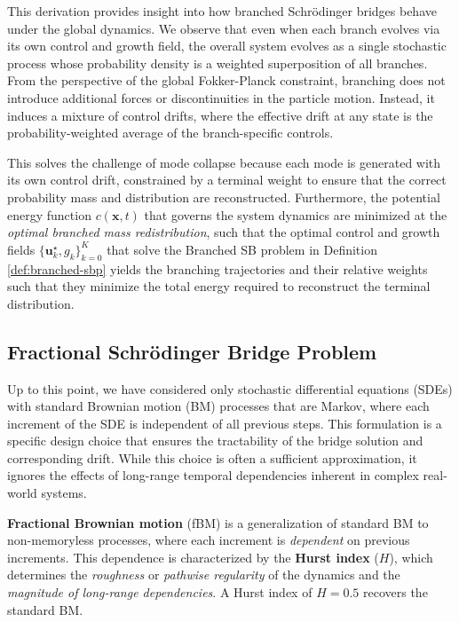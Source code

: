 \documentclass{article}
\newcommand{\boldtext}[1]{\textbf{\textcolor{MyGreen}{#1}}}
\begin{document}
This derivation provides insight into how branched Schrödinger bridges behave under the global dynamics. We observe that even when each branch evolves via its own control and growth field, the overall system evolves as a single stochastic process whose probability density is a weighted superposition of all branches. From the perspective of the global Fokker-Planck constraint, branching does not introduce additional forces or discontinuities in the particle motion. Instead, it induces a mixture of control drifts, where the effective drift at any state is the probability-weighted average of the branch-specific controls.

This solves the challenge of mode collapse because each mode is generated with its own control drift, constrained by a terminal weight to ensure that the correct probability mass and distribution are reconstructed. Furthermore, the potential energy function $c(\boldsymbol{x},t)$ that governs the system dynamics are minimized at the \textit{optimal branched mass redistribution}, such that the optimal control and growth fields $\{\boldsymbol{u}^\star_{k}, g_{k}\}_{k=0}^K$ that solve the Branched SB problem in Definition \ref{def:branched-sbp} yields the branching trajectories and their relative weights such that they minimize the total energy required to reconstruct the terminal distribution. 

\subsection{Fractional Schrödinger Bridge Problem}
\label{subsec:fractional-sbp}

Up to this point, we have considered only stochastic differential equations (SDEs) with standard Brownian motion (BM) processes that are Markov, where each increment of the SDE is independent of all previous steps. This formulation is a specific design choice that ensures the tractability of the bridge solution and corresponding drift. While this choice is often a sufficient approximation, it ignores the effects of long-range temporal dependencies inherent in complex real-world systems. 

\boldtext{Fractional Brownian motion} (fBM) is a generalization of standard BM to non-memoryless processes, where each increment is \textit{dependent} on previous increments. This dependence is characterized by the \boldtext{Hurst index} ($H$), which determines the \textit{roughness} or \textit{pathwise regularity} of the dynamics and the \textit{magnitude of long-range dependencies}. A Hurst index of $H=0.5$ recovers the standard BM.
\end{document}
